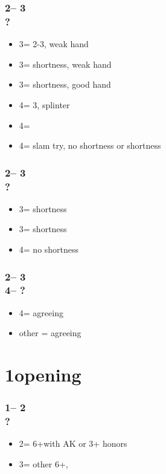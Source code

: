 \documentclass[12pt, a4paper]{article}
\begin{document}
\subsubsection*{2\spades -- 3\diams\\
                ?}
\begin{itemize}
    \item 3\hearts = 2-3\hearts, weak hand
    \item 3\spades = \hearts shortness, weak hand
    \item 3\nt = \hearts shortness, good hand
    \item 4\clubs = 3\hearts, splinter
    \item 4\diams = \hearts
    \item 4\hearts = slam try, no shortness or \diams shortness
\end{itemize}

\subsubsection*{2\spades -- 3\hearts\\
                ?}
\begin{itemize}
    \item 3\spades = \clubs shortness
    \item 3\nt = \diams shortness
    \item 4\clubs = no \minor shortness
\end{itemize}

\subsubsection*{2\spades -- 3\hearts\\
                4\clubs -- ?}
\begin{itemize}
    \item 4\diams = agreeing \diams
    \item other = agreeing \clubs
\end{itemize}

\section{1\nt opening}

\subsubsection*{1\nt -- 2\clubs\\
                ?}
\begin{itemize}
    \item 2\nt = 6+\minor with AK or 3+ honors
    \item 3\minor = other 6+\minor, \nf
\end{itemize}
\end{document}
